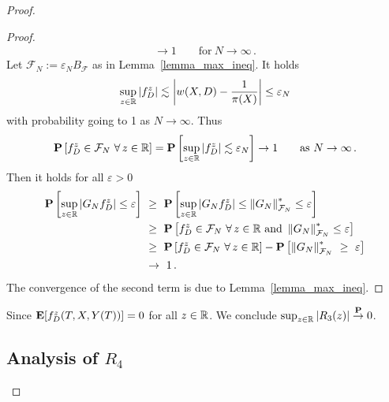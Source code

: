 \begin{proof}
\begin{proof}
\begin{gather}
    \to 1 
    \qquad
    \text{for}\ 
    N\to \infty
    \,.
  \end{gather}
  Let
  $\mathcal{F}_N:=\varepsilon_NB_\mathcal{F}$ as in 
  Lemma~\ref{lemma_max_ineq}.
  It holds
\begin{gather}
      \sup_{z\in\mathbb{R}}
      \left| 
    f_D^z
      \right|
      \lesssim
      \left| 
      w(X,D)
      -
      \frac{1}{\pi(X)}
      \right|
      \le
      \varepsilon_N
\end{gather}
with probability going to 1 as $N\to\infty$.
Thus
 \begin{gather}
    \P
    \left[ 
    f_D^z
    \in
  \mathcal{F}_N
  \ \forall\,z\in\R
    \right]
    =
    \P
    \left[ 
      \sup_{z\in\R}
      \left| 
    f_D^z
      \right|
      \lesssim
      \varepsilon_N
    \right]
    \to 1
    \qquad
    \text{as}
    \ 
    N\to\infty
    \,.
  \end{gather}
  Then it holds
  for all $\varepsilon>0$ 
  \begin{align*}
    \P
    \left[ 
      \sup_{z\in\R}
  \left| G_Nf_D^z \right|
  \le
  \varepsilon
    \right]
    &
    \ 
    \ge
    \ 
    \P
    \left[ 
      \sup_{z\in\R}
  \left| G_Nf_D^z \right|
  \le
  \norm{G_N}^*_{\mathcal{F}_N}
  \le
  \varepsilon
    \right]
    \\
    &
    \ 
    \ge
    \ 
    \P
    \left[ 
    f_D^z
    \in
  \mathcal{F}_N
  \ \forall\,z\in\R
      \ 
      \text{and}\ 
  \norm{G_N}^*_{\mathcal{F}_N}
  \le
  \varepsilon
    \right]
    \\
    &
    \ 
    \ge
    \ 
    \P
    \left[ 
    f_D^z
    \in
  \mathcal{F}_N
  \ \forall\,z\in\R
    \right]
    -
    \P
    \left[ 
  \norm{G_N}^*_{\mathcal{F}_N}
    \ 
  \ge
    \ 
  \varepsilon
    \right]
    \\
    &
    \ 
    \to
    \ 
    1
    \,.
  \end{align*}
  The convergence of the second term is due to Lemma~\ref{lemma_max_ineq}.

\end{proof}
  Since
  $
  \mathbf{E}
  [
    f_{D}^z(T,X,Y(T))
  ]
  =
  0
  $
  for all $z\in\mathbb{R}$.
  We conclude
  $\sup_{z\in\mathbb{R}}\left| R_3(z) \right|\overset{\mathbf{P}}{\to}0$.
  \subsection*{Analysis of $R_4$}
\end{proof}
